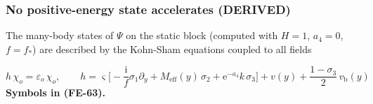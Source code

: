 \documentclass[
  10pt,
]{article}
\begin{document}
\hypertarget{no-positive-energy-state-accelerates-derived}{%
\subsubsection*{No positive-energy state accelerates
(DERIVED)}\label{no-positive-energy-state-accelerates-derived}}

The many-body states of \(\Psi\) on the static block (computed with
\(H = 1\), \(a_4 = 0\), \(f = f_*\)) are described by the Kohn-Sham
equations coupled to all fields

\[
h\,\chi_o = \varepsilon_o\,\chi_o,\qquad
h = \varsigma\Big[-\frac{\mathrm{i}}{f}\sigma_1\partial_y + M_{\mathrm{eff}}(y)\,\sigma_2 +
 \mathrm{e}^{-a_4}k\,\sigma_3\Big] + v(y)
 + \frac{1 - \sigma_3}{2}\,v_{\mathrm{b}}(y) \tag{FE-63}
\] \textbf{Symbols in (FE-63).}
\end{document}
